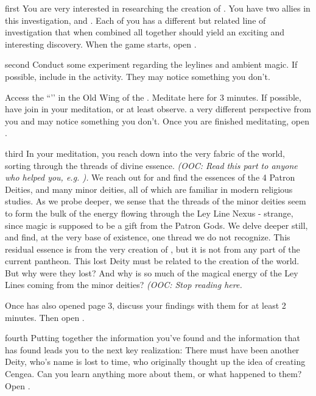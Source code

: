\documentclass[notebook]{GL2020} %
\begin{document}
\startnotebook{\nCreationThree{}}

\begin{page}{first}
You are very interested in researching the creation of \pEarth{}. You have two allies in this investigation, \cEbbPriest{} and \cHeadScientist{}. Each of you has a different but related line of investigation that when combined all together should yield an exciting and interesting discovery. When the game starts, open .
\end{page}

\begin{page}{second}
Conduct some experiment regarding the leylines and ambient magic. If possible, include \cDisney{} in the activity. They may notice something you don’t.

Access the ``\sLeyLinesNexus{}’’ in the Old Wing of the \pSc{}. Meditate here for 3 minutes. If possible, have \cDisney{} join in your meditation, or at least observe. \cDisney{\They} \cDisney{\have} a very different perspective from you and may notice something you don’t. Once you are finished meditating, open .
\end{page}

\begin{page}{third}
In your meditation, you reach down into the very fabric of the world, sorting through the threads of divine essence. \emph{(OOC: Read this part to anyone who helped you, e.g. \cDisney{}).} We reach out for and find the essences of the 4 Patron Deities, and many minor deities, all of which are familiar in modern religious studies. As we probe deeper, we sense that the threads of the minor deities seem to form the bulk of the energy flowing through the Ley Line Nexus - strange, since magic is supposed to be a gift from the Patron Gods. We delve deeper still, and find, at the very base of existence, one thread we do not recognize. This residual essence is from the very creation of \pEarth{}, but it is not from any part of the current pantheon. This lost Deity must be related to the creation of the world. But why were they lost? And why is so much of the magical energy of the Ley Lines coming from the minor deities? \emph{(OOC: Stop reading here.}

Once \textbf{\cEbbPriest{}} has also opened page 3, discuss your findings with them for at least 2 minutes. Then open .
\end{page}

\begin{page}{fourth}
Putting together the information you've found and the information that \cEbbPriest{} has found leads you to the next key realization: There must have been another Deity, who’s name is lost to time, who originally thought up the idea of creating Cengea. Can you learn anything more about them, or what happened to them? Open .
\end{page}
\end{document}
